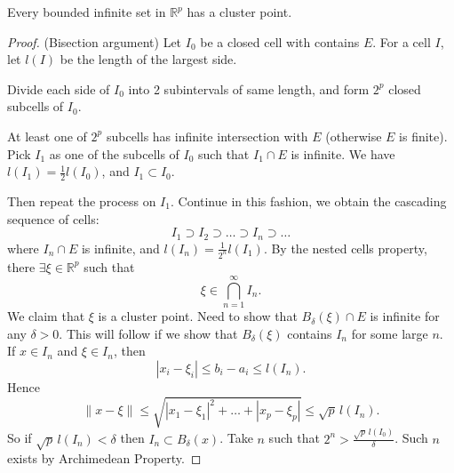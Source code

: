 \begin{theorem}
	Every bounded infinite set in $\mathbb{R}^p$ has a cluster point.
\end{theorem}
\begin{proof}
	(Bisection argument) Let $I_0$ be a closed cell with contains $E$. 
	For a cell $I$, let $l(I)$ be the length of the largest side.

	Divide each side of $I_0$ into 2 subintervals of same length, and form $2^p$ closed subcells of $I_0$.

	At least one of $2^p$ subcells has infinite intersection with $E$ (otherwise $E$ is finite). Pick $I_1$ as one of the subcells of $I_0$ such that $I_1 \cap E$ is infinite. We have $l(I_1) = \frac{1}{2} l(I_0)$, and $I_1 \subset I_0$.
	
	Then repeat the process on $I_1$. Continue in this fashion, we obtain the cascading sequence of cells: \[
		I_1 \supset I_2 \supset \ldots \supset I_n \supset \ldots
	\] 
	where $I_n \cap E$ is infinite, and $l(I_n) = \frac{1}{2^n}l(I_1)$. By the nested cells property, there $\exists  \xi \in \mathbb{R}^p$ such that \[
		\xi \in \bigcap_{n=1} ^\infty  I_n
	.\] 
	We claim that $\xi$ is a cluster point.
	Need to show that $B_\delta(\xi) \cap E$ is infinite for any $\delta>0$. This will follow if we show that $B_\delta(\xi)$ contains $I_n$ for some large $n$.
	If $x \in I_n$ and $\xi \in I_n$, then \[
		|x_i - \xi_i| \le b_i - a_i \le l(I_n)
	.\] 
	Hence \[
		\|x - \xi\| \le \sqrt{|x_1-\xi_1|^2 + \ldots+ |x_p - \xi_p|}  \le  \sqrt{p} \,  l(I_n)
	.\] 
	So if $\sqrt{p} \, l(I_n) < \delta$ then $I_n\subset B_{\delta}(x)$. Take $n$ such that $2^n > \frac{\sqrt{p} \,l(I_0)}{\delta} $. Such $n$ exists by Archimedean Property.
\end{proof}


